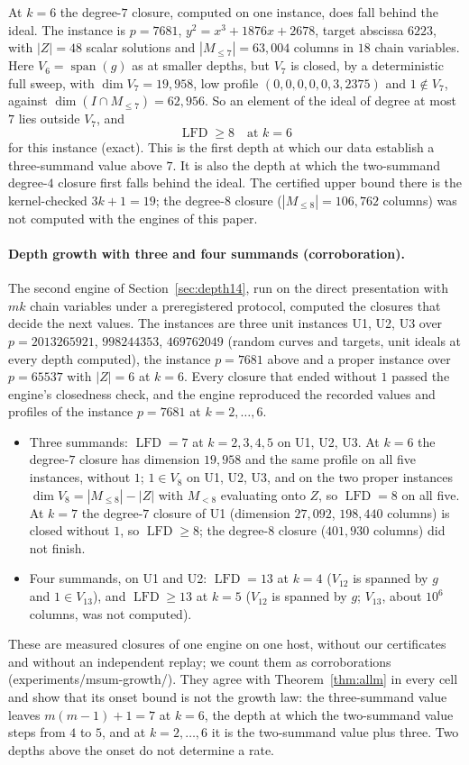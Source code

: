 \documentclass[11pt]{article}
\theoremstyle{definition}\newtheorem{definition}[theorem]{Definition}
\theoremstyle{remark}\newtheorem{remark}[theorem]{Remark}
\newcommand{\lfd}{\operatorname{LFD}}
\newcommand{\codeus}{\textunderscore\allowbreak}
\newcommand{\code}[1]{{\ttfamily\let\_\codeus#1}}
\begin{document}
At $k=6$ the degree-$7$ closure, computed on one instance, does fall behind
the ideal. The instance is $p=7681$, $y^2=x^3+1876x+2678$, target abscissa
$6223$, with $|Z|=48$ scalar solutions and $|M_{\le7}|=63{,}004$ columns in
$18$ chain variables. Here $V_6=\operatorname{span}(g)$ as at smaller depths,
but $V_7$ is closed, by a deterministic full sweep, with
$\dim V_7=19{,}958$, low profile $(0,0,0,0,0,3,2375)$ and $1\notin V_7$,
against $\dim(I\cap M_{\le7})=62{,}956$. So an element of the ideal of degree
at most $7$ lies outside $V_7$, and
\[
 \lfd\ge8\quad\text{at }k=6
\]
for this instance (exact). This is the first depth
at which our data establish a three-summand value above $7$. It is also
the depth at which the two-summand degree-$4$ closure first falls behind
the ideal. The certified upper bound there is the kernel-checked
$3k+1=19$; the degree-$8$ closure ($|M_{\le8}|=106{,}762$ columns) was not
computed with the engines of this paper.

\paragraph{Depth growth with three and four summands (corroboration).}
The second engine of Section~\ref{sec:depth14}, run on the direct
presentation with $mk$ chain variables under a preregistered protocol,
computed the closures that decide the next values. The instances are three
unit instances U1, U2, U3 over $p=2013265921$, $998244353$, $469762049$
(random curves and targets, unit ideals at every depth computed), the
instance $p=7681$ above and a proper instance over $p=65537$ with $|Z|=6$
at $k=6$. Every closure that ended without $1$ passed the engine's
closedness check, and the engine reproduced the recorded values and
profiles of the instance $p=7681$ at $k=2,\ldots,6$.
\begin{itemize}
\item Three summands: $\lfd=7$ at $k=2,3,4,5$ on U1, U2, U3. At $k=6$ the
 degree-$7$ closure has dimension $19{,}958$ and the same profile on all
 five instances, without $1$; $1\in V_8$ on U1, U2, U3, and on the two
 proper instances $\dim V_8=|M_{\le8}|-|Z|$ with $M_{<8}$ evaluating onto
 $Z$, so $\lfd=8$ on all five. At $k=7$ the degree-$7$ closure of U1
 (dimension $27{,}092$, $198{,}440$ columns) is closed without $1$, so
 $\lfd\ge8$; the degree-$8$ closure ($401{,}930$ columns) did not finish.
\item Four summands, on U1 and U2: $\lfd=13$ at $k=4$ ($V_{12}$ is spanned
 by $g$ and $1\in V_{13}$), and $\lfd\ge13$ at $k=5$ ($V_{12}$ is spanned by
 $g$; $V_{13}$, about $10^6$ columns, was not computed).
\end{itemize}
These are measured closures of one engine on one host, without our
certificates and without an independent replay; we count them as
corroborations (\code{experiments/msum-growth/}). They agree with
Theorem~\ref{thm:allm} in every cell and show that its onset bound is not
the growth law: the three-summand value leaves $m(m-1)+1=7$ at $k=6$, the
depth at which the two-summand value steps from $4$ to $5$, and at
$k=2,\ldots,6$ it is the two-summand value plus three. Two depths above the
onset do not determine a rate.
\end{document}
